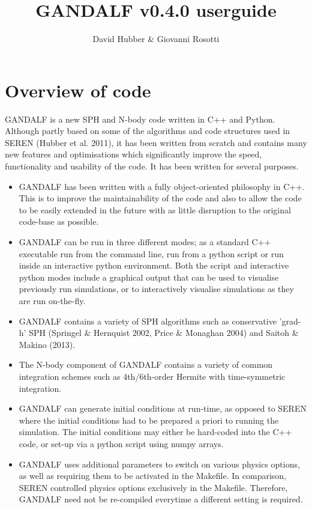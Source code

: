 \documentclass[a4paper]{article}
\newcommand{\VERNO}{0.4.0 }
\begin{document}
\title{GANDALF v\VERNO userguide}
\author{David Hubber \& Giovanni Rosotti}

\maketitle
\tableofcontents

\newpage


\section{Overview of code}
GANDALF is a new SPH and N-body code written in C++ and Python.  Although partly based on some of the algorithms and code structures used in SEREN (Hubber et al. 2011), it has been written from scratch and contains many new features and optimisations which significantly improve the speed, functionality and usability of the code.  It has been written for several purposes.
\begin{itemize}
\item GANDALF has been written with a fully object-oriented philosophy in C++.  This is to improve the maintainability of the code and also to allow the code to be easily extended in the future with as little disruption to the original code-base as possible.
\item GANDALF can be run in three different modes; as a standard C++ executable run from the command line, run from a python script or run inside an interactive python environment.  Both the script and interactive python modes include a graphical output that can be used to visualise previously run simulations, or to interactively visualise simulations as they are run on-the-fly.
\item GANDALF contains a variety of SPH algorithms such as conservative 'grad-h' SPH (Springel \& Hernquist 2002, Price \& Monaghan 2004) and Saitoh \& Makino (2013).
\item The N-body component of GANDALF contains a variety of common integration schemes such as 4th/6th-order Hermite with time-symmetric integration.
\item GANDALF can generate initial conditions at run-time, as opposed to SEREN where the initial conditions had to be prepared a priori to running the simulation.  The initial conditions may either be hard-coded into the C++ code, or set-up via a python script using numpy arrays.
\item GANDALF uses additional parameters to switch on various physics options, as well as requiring them to be activated in the Makefile.  In comparison, SEREN controlled physics options exclusively in the Makefile.  Therefore, GANDALF need not be re-compiled everytime a different setting is required.
\end{itemize}
\end{document}
